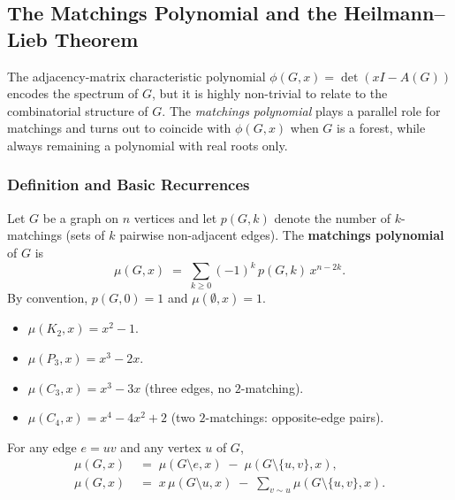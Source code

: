 \subsection{The Matchings Polynomial and the Heilmann--Lieb Theorem}\label{subsec:matchings-polynomial}

The adjacency-matrix characteristic polynomial $\phi(G, x) = \det(xI - A(G))$
encodes the spectrum of $G$, but it is highly non-trivial to relate to
the combinatorial structure of $G$. The \emph{matchings polynomial}
plays a parallel role for matchings and turns out to coincide with
$\phi(G, x)$ when $G$ is a forest, while always remaining a polynomial
with real roots only.

\subsubsection{Definition and Basic Recurrences}

\begin{definition}\label{def:matchpoly}
Let $G$ be a graph on $n$ vertices and let $p(G, k)$ denote the number
of $k$-matchings (sets of $k$ pairwise non-adjacent edges). The
\textbf{matchings polynomial} of $G$ is
\[
  \mu(G, x) \;=\; \sum_{k \ge 0} (-1)^k\, p(G, k)\, x^{n - 2k}.
\]
By convention, $p(G, 0) = 1$ and $\mu(\emptyset, x) = 1$.
\end{definition}

\begin{example}
\mbox{}
\begin{itemize}
  \item $\mu(K_2, x) = x^2 - 1$.
  \item $\mu(P_3, x) = x^3 - 2x$.
  \item $\mu(C_3, x) = x^3 - 3x$ (three edges, no $2$-matching).
  \item $\mu(C_4, x) = x^4 - 4x^2 + 2$ (two $2$-matchings: opposite-edge pairs).
\end{itemize}
\end{example}

\begin{theorem}\label{thm:matchrec}
For any edge $e = uv$ and any vertex $u$ of $G$,
\begin{align*}
  \mu(G, x) &\;=\; \mu(G \setminus e, x) \;-\; \mu(G \setminus \{u, v\}, x), \\
  \mu(G, x) &\;=\; x\,\mu(G \setminus u, x) \;-\; \sum_{v \sim u} \mu(G \setminus \{u, v\}, x).
\end{align*}
\end{theorem}

